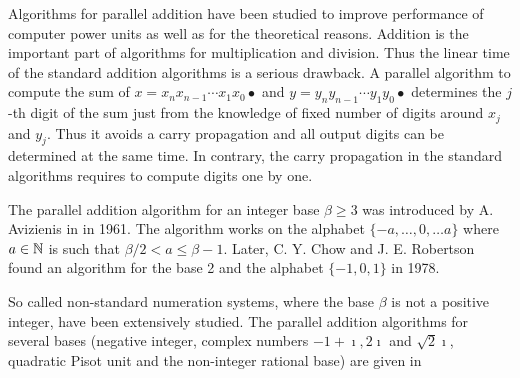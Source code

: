 Algorithms for parallel addition have been studied to improve performance of computer power units as well as for the theoretical reasons. Addition is the important part of algorithms for multiplication and division. Thus the linear time of the standard addition algorithms is a serious drawback. A parallel algorithm to compute the sum of $x=x_n x_{n-1}\cdots x_1 x_0 \bullet$ and $y=y_n y_{n-1}\cdots y_1 y_0 \bullet$ determines the $j$-th digit of the sum just from the knowledge of fixed number of digits around $x_j$ and $y_j$. Thus it avoids a carry propagation and all output digits can be determined at the same time. In contrary, the carry propagation in the standard algorithms requires to compute digits one by one.

The parallel addition algorithm for an integer base $\beta\geq3$ was introduced by A. Avizienis in \cite{avizienis} in 1961. The algorithm works on the alphabet $\{-a, \dots, 0, \dots a\}$ where $a\in\mathbb{N}$ is such that $\beta/2 <a \leq \beta-1$. Later, C. Y. Chow and J. E. Robertson \cite{chow} found an algorithm for the base 2 and the alphabet $\{-1,0,1\}$ in 1978.   

So called non-standard numeration systems, where the base $\beta$ is not a positive integer, have been extensively studied. The parallel addition algorithms for several bases (negative integer, complex numbers $-1+\imath, 2\imath$ and $\sqrt{2}\imath$, quadratic Pisot unit and the non-integer rational base) are given in \cite{minAlph}     